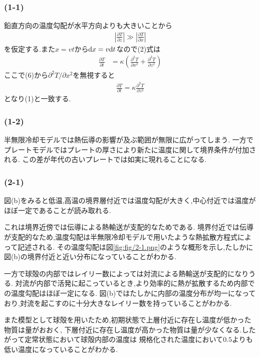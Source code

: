 \setcounter{equation}{5}
\subsubsection*{(1-1)}
鉛直方向の温度勾配が水平方向よりも大きいことから
\begin{align}
  \left|\frac{\partial T}{\partial z}\right|\gg\left|\frac{\partial T}{\partial x}\right|
\end{align}
を仮定する.また$x=vt$から${\rm d}x=v{\rm d}t$なので(2)式は
\begin{align}
  \frac{\partial T}{\partial t}&=\kappa\left(\frac{\partial^2T}{\partial x^2}+\frac{\partial^2 T}{\partial z^2}\right)
\end{align}
ここで(6)から$\partial^2 T/\partial x^2$を無視すると
\begin{align}
  \frac{\partial T}{\partial t}=\kappa\frac{\partial^2 T}{\partial z^2}
\end{align}
となり(1)と一致する.
\subsubsection*{(1-2)}
半無限冷却モデルでは熱伝導の影響が及ぶ範囲が無限に広がってしまう.
一方でプレートモデルではプレートの厚さにより新たに温度に関して境界条件が付加される.
この差が年代の古いプレートでは如実に現れることになる.
\subsubsection*{(2-1)}
図(b)をみると低温,高温の境界層付近では温度勾配が大きく,中心付近では温度がほぼ一定であることが読み取れる.

これは境界近傍では伝導による熱輸送が支配的なためである.
境界付近では伝導が支配的なため,温度勾配は半無限冷却モデルで用いたような熱拡散方程式によって記述される.
その温度勾配は図\ref{fig:fig/2-1.png}のような概形を示し,たしかに図(b)の境界付近と近い分布になっていることがわかる.

一方で球殻の内部ではレイリー数によっては対流による熱輸送が支配的になりうる.
対流が内部で活発に起こっているとき,より効率的に熱が拡散するため内部での温度勾配はほぼ一定になる.
図(b)ではたしかに内部の温度分布が均一になっており,対流を起こすのに十分大きなレイリー数を持っていることがわかる.

また模型として球殻を用いたため,初期状態で上層付近に存在し温度が低かった物質は量がおおく,
下層付近に存在し温度が高かった物質は量が少なくなる.したがって定常状態において球殻内部の温度は
規格化された温度において$0.5$よりも低い温度になっていることがわかる.
